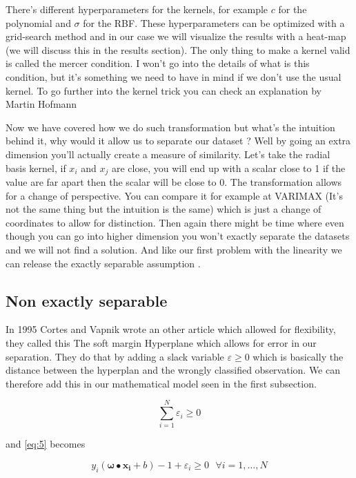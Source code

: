 \documentclass[a4paper,11pt]{article}
\numberwithin{equation}{section}
\begin{document}
There's different hyperparameters for the kernels, for example $c$ for the polynomial and $\sigma$ for the RBF. These hyperparameters can be optimized with a grid-search method and in our case we will visualize the results with a heat-map (we will discuss this in the results section). The only thing to make a kernel valid is called the mercer condition. I won't go into the details of what is this condition, but it's something we need to have in mind if we don't use the usual kernel. To go further into the kernel trick you can check an explanation by Martin Hofmann \cite{Hofmann-2006}

Now we have covered how we do such transformation but what's the intuition behind it, why would it allow us to separate our dataset ? Well by going an extra dimension you'll actually create a measure of similarity. Let's take the radial basis kernel, if $x_i$ and $x_j$ are close, you will end up with a scalar close to 1 if the value are far apart then the scalar will be close to 0. The transformation allows for a change of perspective. You can compare it for example at VARIMAX (It's not the same thing but the intuition is the same) which is just a change of coordinates to allow for distinction. Then again there might be time where even though you can go into higher dimension you won't exactly separate the datasets and we will not find a solution. And like our first problem with the linearity we can release the exactly separable assumption .

\subsection{Non exactly separable}

In 1995 Cortes and Vapnik wrote an other article \cite{Cortes:1995:SN:218919.218929} which allowed for flexibility, they called this The soft margin Hyperplane which allows for error in our separation. They do that by adding a slack variable $\varepsilon \geq 0 $ which is basically the distance between the hyperplan and the wrongly classified observation. We can therefore add this in our mathematical model seen in the first subsection.

$$\sum_{i=1}^{N}\varepsilon_i \geq 0$$

and \ref{eq:5} becomes

\begin{equation}\label{eq:13}
y_i(\boldsymbol{\omega}\bullet\boldsymbol{x_i}+b)-1+\varepsilon_i\geq 0 \mbox{   } \forall i = 1,\dots,N
\end{equation}
\end{document}

